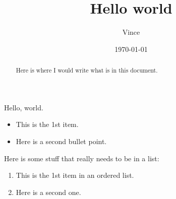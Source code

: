 \documentclass{article}
\title{Hello world}
\author{Vince}
\date{\today}
\begin{document}
\maketitle

\begin{abstract}
    Here is where I would write what is in this document.
\end{abstract}

Hello, world.

\begin{itemize}
    \item This is the 1st item.
    \item Here is a second bullet point.
\end{itemize}

Here is some stuff that really needs to be in a list:

\begin{enumerate}
    \item This is the 1st item in an ordered list.
    \item Here is a second one.
\end{enumerate}
\end{document}
